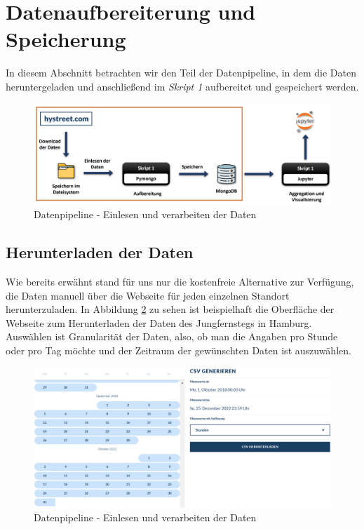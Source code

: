 \section{Datenaufbereiterung und Speicherung}
In diesem Abschnitt betrachten wir den Teil der Datenpipeline, in dem die Daten heruntergeladen und anschließend im \emph{Skript 1} aufbereitet und gespeichert werden.

\begin{figure}[h!]
    \vspace{0.7cm}
    \centering
    \includegraphics[width=0.8\linewidth]{images/datenpipelineT1.png}
    \caption{Datenpipeline - Einlesen und verarbeiten der Daten}
    \label{fig:datenpipelineT1}
\end{figure}

\subsection{Herunterladen der Daten}
Wie bereits erwähnt stand für uns nur die kostenfreie Alternative zur Verfügung, die Daten manuell über die Webseite für jeden einzelnen Standort herunterzuladen. In Abbildung \ref{fig:hystreet-download} zu sehen ist beispielhaft die Oberfläche der Webseite zum Herunterladen der Daten des Jungfernstegs in Hamburg. Auswählen ist Granularität der Daten, also, ob man die Angaben pro Stunde oder pro Tag möchte und der Zeitraum der gewünschten Daten ist auszuwählen.

\begin{figure}[h!]
    \vspace{0.4cm}
    \centering
    \includegraphics[width=0.9\linewidth]{images/hystreet-datendownload.png}
    \caption{Datenpipeline - Einlesen und verarbeiten der Daten}
    \label{fig:hystreet-download}
    \vspace{0.1cm}
\end{figure}

